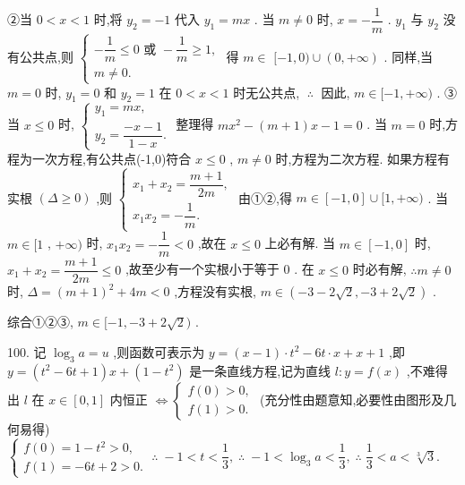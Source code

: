②当 $0 < x < 1$ 时,将 ${y}_{2} =  - 1$ 代入 ${y}_{1} = {mx}$ . 当 $m \neq  0$ 时, $x =  - \dfrac{1}{m}$ . ${y}_{1}$ 与 ${y}_{2}$ 没有公共点,则 $\left\{  \begin{array}{l}  - \dfrac{1}{m} \leq  0\text{ 或 } - \dfrac{1}{m} \geq  1, \\  m \neq  0. \end{array}\right.$ 得 $m \in$  $\lbrack  - 1,0) \cup  \left( {0, + \infty }\right)$ . 同样,当 $m = 0$ 时, ${y}_{1} = 0$ 和 ${y}_{2} = 1$ 在 $0 < x < 1$ 时无公共点, $\;\therefore \;$ 因此, $m \in  \lbrack  - 1, + \infty )$ . ③当 $x \leq  0$ 时, $\left\{  \begin{array}{l} {y}_{1} = {mx}, \\  {y}_{2} = \dfrac{-x - 1}{1 - x}. \end{array}\right.$ 整理得 $m{x}^{2} - \left( {m + 1}\right) x - 1 = 0$ . 当 $m = 0$ 时,方程为一次方程,有公共点(-1,0)符合 $x \leq  0$ , $m \neq  0$ 时,方程为二次方程. 如果方程有实根 $\left( {\Delta  \geq  0}\right)$ ,则 $\left\{  \begin{array}{l} {x}_{1} + {x}_{2} = \dfrac{m + 1}{2m}, \\  {x}_{1}{x}_{2} =  - \dfrac{1}{m}. \end{array}\right.$ 由①②,得 $m \in  \left\lbrack  {-1,0}\right\rbrack   \cup  \lbrack 1, + \infty )$ . 当 $m \in  \lbrack 1$ , $+ \infty )$ 时, ${x}_{1}{x}_{2} =  - \dfrac{1}{m} < 0$ ,故在 $x \leq  0$ 上必有解. 当 $m \in  \left\lbrack  {-1,0}\right\rbrack$ 时, ${x}_{1} + {x}_{2} = \dfrac{m + 1}{2m} \leq  0$ ,故至少有一个实根小于等于 0 . 在 $x \leq  0$ 时必有解, $\therefore m \neq  0$ 时, $\Delta  = {\left( m + 1\right) }^{2} + {4m} < 0$ ,方程没有实根, $m \in  \left( {-3 - 2\sqrt{2}, - 3 + 2\sqrt{2}}\right)$ .

综合①②③, $m \in  \lbrack  - 1, - 3 + 2\sqrt{2})$ .

100. 记 ${\log }_{3}a = u$ ,则函数可表示为 $y = \left( {x - 1}\right)  \cdot  {t}^{2} - {6t} \cdot  x + x + 1$ ,即 $y = \left( {{t}^{2} - {6t} + 1}\right) x + \left( {1 - {t}^{2}}\right)$ 是一条直线方程,记为直线 $l : y = f\left( x\right)$ ,不难得出 $l$ 在 $x \in  \left\lbrack  {0,1}\right\rbrack$ 内恒正 $\Leftrightarrow  \left\{  \begin{array}{l} f\left( 0\right)  > 0, \\  f\left( 1\right)  > 0. \end{array}\right.$ (充分性由题意知,必要性由图形及几何易得) $\left\{  {\begin{array}{l} f\left( 0\right)  = 1 - {t}^{2} > 0, \\  f\left( 1\right)  =  - {6t} + 2 > 0. \end{array}\;\therefore \; - 1 < t < \dfrac{1}{3},\;\therefore \; - 1 < {\log }_{3}a < \dfrac{1}{3},\;\therefore \;\dfrac{1}{3} < a < \sqrt[3]{3}.}\right.$


